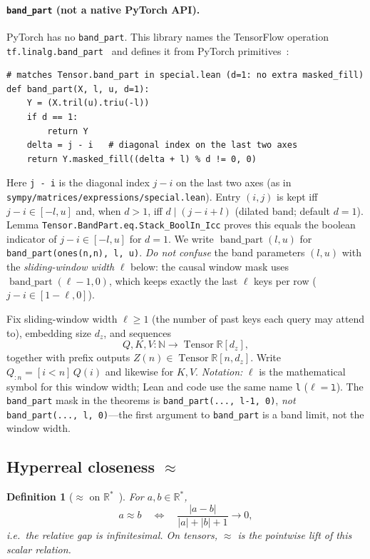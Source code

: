 \documentclass[11pt,a4paper]{article}
\newtheorem{definition}[theorem]{Definition}
\newcommand{\Tensor}{\operatorname{Tensor}}
\newcommand{\bandpart}{\operatorname{band\_part}}
\newcommand{\XEq}{\approx}
\newcommand{\Rstar}{\mathbb{R}^*}
\begin{document}
\paragraph{\texttt{band\_part} (not a native PyTorch API).}
PyTorch has no \texttt{band\_part}.
This library names the TensorFlow operation \texttt{tf.linalg.band\_part}~\cite{tensorflow_band_part} and defines it from PyTorch primitives~\cite{lemma_repo}:
\begin{verbatim}
# matches Tensor.band_part in special.lean (d=1: no extra masked_fill)
def band_part(X, l, u, d=1):
    Y = (X.tril(u).triu(-l))
    if d == 1:
        return Y
    delta = j - i   # diagonal index on the last two axes
    return Y.masked_fill((delta + l) % d != 0, 0)
\end{verbatim}
\noindent
Here \texttt{j - i} is the diagonal index $j-i$ on the last two axes (as in \texttt{sympy/matrices/expressions/special.lean}).
Entry $(i,j)$ is kept iff $j-i\in[-l,u]$ and, when $d>1$, iff $d\mid(j-i+l)$ (dilated band; default $d=1$).
Lemma \texttt{Tensor.BandPart.eq.Stack\_BoolIn\_Icc} proves this equals the boolean indicator of $j-i\in[-l,u]$ for $d=1$.
We write $\bandpart(l,u)$ for \texttt{band\_part(ones(n,n), l, u)}.
\emph{Do not confuse} the band parameters $(l,u)$ with the \emph{sliding-window width} $\ell$ below: the causal window mask uses $\bandpart(\ell-1,0)$, which keeps exactly the last $\ell$ keys per row ($j-i\in[1-\ell,0]$).

Fix sliding-window width $\ell\ge 1$ (the number of past keys each query may attend to), embedding size $d_z$, and sequences
\[
Q,K,V:\mathbb{N}\to\Tensor\mathbb{R}[d_z],
\]
together with prefix outputs $Z(n)\in\Tensor\mathbb{R}[n,d_z]$.
Write $Q_{:n}=[i<n]\,Q(i)$ and likewise for $K,V$.
\emph{Notation:} $\ell$ is the mathematical symbol for this window width; Lean and code use the same name \texttt{l} ($\ell=\texttt{l}$).
The \texttt{band\_part} mask in the theorems is \texttt{band\_part(..., l-1, 0)}, \emph{not} \texttt{band\_part(..., l, 0)}---the first argument to \texttt{band\_part} is a band limit, not the window width.

\subsection{Hyperreal closeness \texorpdfstring{$\XEq$}{approx}}

\begin{definition}[\texorpdfstring{$\XEq$}{approx} on \texorpdfstring{$\Rstar$}{R*}~\cite{lemma_xeq}]
\label{def:xeq}
For $a,b\in\Rstar$,
\[
a\XEq b
\quad\Longleftrightarrow\quad
\frac{|a-b|}{|a|+|b|+1}\to 0,
\]
i.e.\ the relative gap is infinitesimal.
On tensors, $\XEq$ is the pointwise lift of this scalar relation.
\end{definition}
\end{document}
